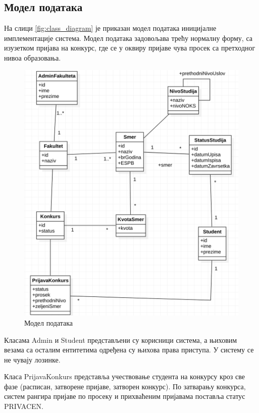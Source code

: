 \documentclass[a4paper]{article}
\begin{document}
\subsection*{Модел података}

На слици \autoref{fig:class_diagram} је приказан модел података иницијалне имплементације система. Модел података задовољава трећу нормалну форму, са
изузетком пријава на конкурс, где се у оквиру пријаве чува просек са претходног нивоа образовања.

\begin{figure}[H]
    \centering
    \includegraphics{images/class_diagram.png}
    \caption{Модел података}
    \label{fig:class_diagram}
\end{figure}

Класама Admin и Student представљени су корисници система, а њиховим везама са осталим ентитетима одређена су њихова права приступа. У систему се не чувају лозинке.

Класа PrijavaKonkurs представља учествовање студента на конкурсу кроз све фазе (расписан, затворене пријаве, затворен конкурс).
По затварању конкурса, систем рангира пријаве по просеку и прихваћеним пријавама поставља статус PRIVACEN.
\end{document}
